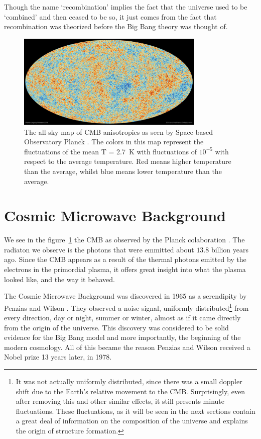 Though the name `recombination' implies the fact that the universe used to be `combined' and then ceased to be so, it just comes from the fact that recombination was theorized before the Big Bang theory was thought of.



\begin{figure}[t]
	\centering
	\includegraphics[width=0.8\textwidth]{../figs/cmb.jpeg}
	\caption[The all-sky map of CMB anisotropies as seen by space-based Observatory Planck]{The all-sky map of CMB anisotropies as seen by Space-based Observatory Planck \cite{Planck2018}. The colors in this map represent the fluctuations of the mean T = \SI{2.7}{K} with fluctuations of $10^{-5}$ with respect to the average temperature. Red means higher temperature than the average, whilst blue means lower temperature than the average.}
	\label{fig:cmb}
\end{figure}
\section{Cosmic Microwave Background}

We see in the figure~\ref{fig:cmb} the CMB as observed by the Planck colaboration \cite{Planck2018}. The radiaton we observe is the photons that were emmitted about $13.8$ billion years ago. Since the CMB appears as a result of the thermal photons emitted by the electrons in the primordial plasma, it offers great insight into what the plasma looked like, and the way it behaved. 

The Cosmic Microwave Background was discovered in 1965 as a serendipity by Penzias and Wilson \cite{Penzias1965}. They observed a noise signal, uniformly distributed\footnote{It was not actually uniformly distributed, since there was a small doppler shift due to the Earth's relative movement to the CMB. Surprisingly, even after removing this and other similar effects, it still presents minute fluctuations. These fluctuations, as it will be seen in the next sections contain a great deal of information on the composition of the universe and explains the origin of structure formation.} from every direction, day or night, summer or winter, almost as if it came directly from the origin of the universe.
This discovery was considered to be solid evidence for the Big Bang model and more importantly, the beginning of the modern cosmology. All of this became the reason Penzias and Wilson received a Nobel prize 13 years later, in 1978.

